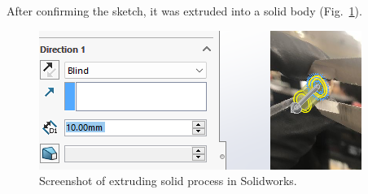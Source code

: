 \documentclass[conference, letterpaper]{IEEEtran}
\begin{document}
            After confirming the sketch, it was extruded into a solid body (Fig.~\ref{ulna_extrude}).
            \begin{figure}[htbp]
                \centerline{\includegraphics[width = \linewidth]{ulna_extrude.png}}
                \caption{Screenshot of extruding solid process in Solidworks.}\label{ulna_extrude}
            \end{figure}
\end{document}
